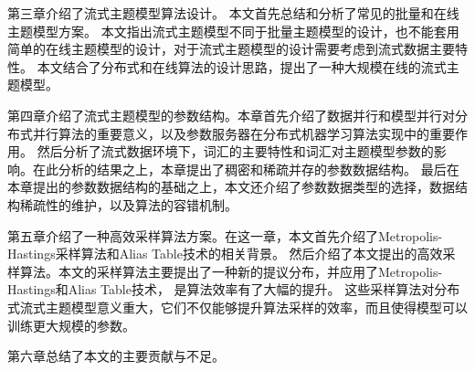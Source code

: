 第三章介绍了流式主题模型算法设计。
本文首先总结和分析了常见的批量和在线主题模型方案。
本文指出流式主题模型不同于批量主题模型的设计，也不能套用简单的在线主题模型的设计，对于流式主题模型的设计需要考虑到流式数据主要特性。
本文结合了分布式和在线算法的设计思路，提出了一种大规模在线的流式主题模型。

第四章介绍了流式主题模型的参数结构。本章首先介绍了数据并行和模型并行对分布式并行算法的重要意义，以及参数服务器在分布式机器学习算法实现中的重要作用。
然后分析了流式数据环境下，词汇的主要特性和词汇对主题模型参数的影响。在此分析的结果之上，本章提出了稠密和稀疏并存的参数数据结构。
最后在本章提出的参数数据结构的基础之上，本文还介绍了参数数据类型的选择，数据结构稀疏性的维护，以及算法的容错机制。

第五章介绍了一种高效采样算法方案。在这一章，本文首先介绍了Metropolis-Hastings采样算法和Alias Table技术的相关背景。
然后介绍了本文提出的高效采样算法。本文的采样算法主要提出了一种新的提议分布，并应用了Metropolis-Hastings和Alias Table技术，
是算法效率有了大幅的提升。
这些采样算法对分布式流式主题模型意义重大，它们不仅能够提升算法采样的效率，而且使得模型可以训练更大规模的参数。

第六章总结了本文的主要贡献与不足。
